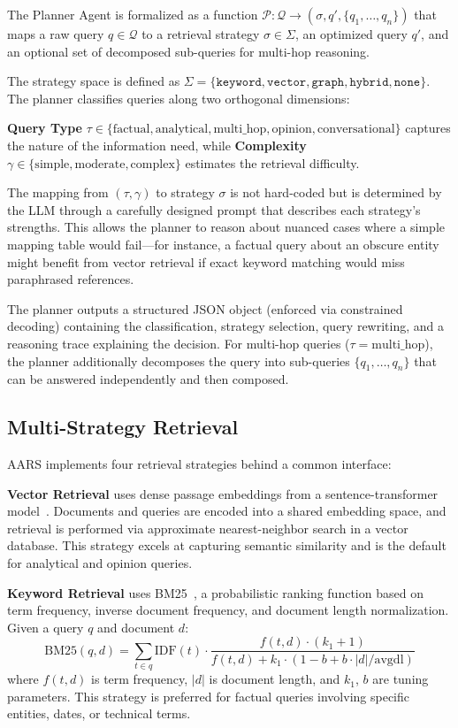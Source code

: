 \documentclass[runningheads]{llncs}
\begin{document}
The Planner Agent is formalized as a function $\mathcal{P}: \mathcal{Q} \rightarrow (\sigma, q', \{q_1, \ldots, q_n\})$ that maps a raw query $q \in \mathcal{Q}$ to a retrieval strategy $\sigma \in \Sigma$, an optimized query $q'$, and an optional set of decomposed sub-queries for multi-hop reasoning.

The strategy space is defined as $\Sigma = \{\texttt{keyword}, \texttt{vector}, \texttt{graph}, \texttt{hybrid}, \texttt{none}\}$. The planner classifies queries along two orthogonal dimensions:

\textbf{Query Type} $\tau \in \{\text{factual}, \text{analytical}, \text{multi\_hop}, \text{opinion}, \text{conversational}\}$ captures the nature of the information need, while \textbf{Complexity} $\gamma \in \{\text{simple}, \text{moderate}, \text{complex}\}$ estimates the retrieval difficulty.

The mapping from $(\tau, \gamma)$ to strategy $\sigma$ is not hard-coded but is determined by the LLM through a carefully designed prompt that describes each strategy's strengths. This allows the planner to reason about nuanced cases where a simple mapping table would fail---for instance, a factual query about an obscure entity might benefit from vector retrieval if exact keyword matching would miss paraphrased references.

The planner outputs a structured JSON object (enforced via constrained decoding) containing the classification, strategy selection, query rewriting, and a reasoning trace explaining the decision. For multi-hop queries ($\tau = \text{multi\_hop}$), the planner additionally decomposes the query into sub-queries $\{q_1, \ldots, q_n\}$ that can be answered independently and then composed.

\subsection{Multi-Strategy Retrieval}

AARS implements four retrieval strategies behind a common interface:

\textbf{Vector Retrieval} uses dense passage embeddings from a sentence-transformer model~\cite{Reimers2019}. Documents and queries are encoded into a shared embedding space, and retrieval is performed via approximate nearest-neighbor search in a vector database. This strategy excels at capturing semantic similarity and is the default for analytical and opinion queries.

\textbf{Keyword Retrieval} uses BM25~\cite{Robertson2009}, a probabilistic ranking function based on term frequency, inverse document frequency, and document length normalization. Given a query $q$ and document $d$:
\begin{equation}
\text{BM25}(q, d) = \sum_{t \in q} \text{IDF}(t) \cdot \frac{f(t,d) \cdot (k_1 + 1)}{f(t,d) + k_1 \cdot (1 - b + b \cdot |d|/\text{avgdl})}
\end{equation}
where $f(t,d)$ is term frequency, $|d|$ is document length, and $k_1$, $b$ are tuning parameters. This strategy is preferred for factual queries involving specific entities, dates, or technical terms.
\end{document}
